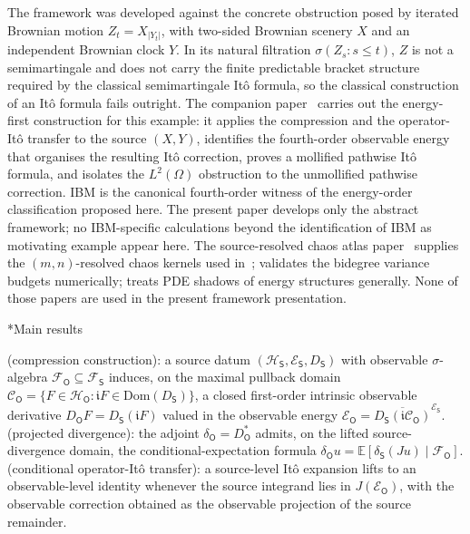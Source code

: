\documentclass[11pt,reqno]{amsart}
\makeatletter
\renewcommand\subsection{\@startsection{subsection}{2}%
  \z@{.7\linespacing}{.5\linespacing}%
  {\normalfont\centering\scshape}}
\theoremstyle{plain}
\theoremstyle{definition}
\theoremstyle{remark}
\newcommand{\E}{\mathbb{E}}
\newcommand{\Hilb}{\mathcal{H}}
\newcommand{\Dom}{\mathrm{Dom}}
\newcommand{\Energy}{\mathcal{E}}
\newcommand{\Source}{\mathsf{S}}
\newcommand{\Obs}{\mathsf{O}}
\renewcommand{\iota}{\mathfrak{i}}
\newcommand{\IBM}{Z}
\makeatother
\begin{document}
The framework was developed against the concrete obstruction posed by
iterated Brownian motion $\IBM_{t}=X_{|Y_{t}|}$, with two-sided
Brownian scenery $X$ and an independent Brownian clock $Y$. In its
natural filtration $\sigma(\IBM_s:s\le t)$, $\IBM$ is not a
semimartingale and does not carry the finite predictable bracket
structure required by the classical semimartingale It\^o formula, so
the classical construction of an It\^o formula fails outright. The companion
paper~\cite{IBMPaper} carries out the energy-first construction for
this example: it applies the compression and the operator-It\^o
transfer to the source $(X,Y)$, identifies the fourth-order
observable energy that organises the resulting It\^o correction,
proves a mollified pathwise It\^o formula, and isolates the
$L^{2}(\Omega)$ obstruction to the unmollified pathwise correction.
IBM is the canonical fourth-order witness of the energy-order
classification proposed here. The present paper develops only the
abstract framework; no IBM-specific calculations beyond the
identification of IBM as motivating example appear here. The
source-resolved chaos atlas paper~\cite{Fontes-IBMchaos} supplies the
$(m,n)$-resolved chaos kernels used in~\cite{IBMPaper};
\cite{Fontes-IBMnumerical} validates the bidegree variance budgets
numerically; \cite{Fontes-PDEgenerators} treats PDE shadows of energy
structures generally. None of those papers are used in the present
framework presentation.

\subsection*{Main results}

 (compression construction): a source datum
$(\Hilb_\Source,\Energy_\Source,D_\Source)$ with observable
$\sigma$-algebra $\mathcal F_\Obs\subseteq\mathcal F_\Source$ induces,
on the maximal pullback domain
$\mathcal C_\Obs=\{F\in\Hilb_\Obs:\iota F\in\Dom(D_\Source)\}$, a
closed first-order intrinsic observable derivative
$D_\Obs F=D_\Source(\iota F)$ valued in the observable energy
$\Energy_\Obs=\overline{D_\Source(\iota \mathcal C_\Obs)}^{\Energy_\Source}$.
 (projected divergence): the adjoint
$\delta_\Obs=D_\Obs^{*}$ admits, on the lifted source-divergence
domain, the conditional-expectation formula
$\delta_\Obs u=\E[\delta_\Source(Ju)\mid\mathcal F_\Obs]$.
 (conditional operator-It\^o transfer): a
source-level It\^o expansion lifts to an observable-level identity
whenever the source integrand lies in $J(\Energy_\Obs)$, with the
observable correction obtained as the observable projection of the
source remainder.
\end{document}
